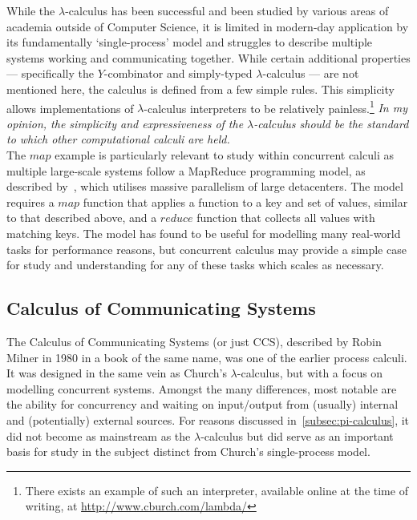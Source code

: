\documentclass{article}
\begin{document}
        
        \begin{remarks}
            While the $\lambda$-calculus has been successful and been studied by various areas of academia outside of Computer Science, it is limited in modern-day application by its fundamentally `single-process' model and struggles to describe multiple systems working and communicating together. 
            While certain additional properties --- specifically the $Y$-combinator and simply-typed $\lambda$-calculus --- are not mentioned here, the calculus is defined from a few simple rules.
            This simplicity allows implementations of $\lambda$-calculus interpreters to be relatively painless.\footnote{There exists an example of such an interpreter, available online at the time of writing, at \url{http://www.cburch.com/lambda/}}
            \textit{In my opinion, the simplicity and expressiveness of the $\lambda$-calculus should be the standard to which other computational calculi are held.}\\

            The ${map}$ example is particularly relevant to study within concurrent calculi as multiple large-scale systems follow a MapReduce programming model, as described by~\cite{mapreduce}, which utilises massive parallelism of large detacenters.
            The model requires a ${map}$ function that applies a function to a key and set of values, similar to that described above, and a ${reduce}$ function that collects all values with matching keys.
            The model has found to be useful for modelling many real-world tasks for performance reasons, but concurrent calculus may provide a simple case for study and understanding for any of these tasks which scales as necessary.

        \end{remarks}



    \subsection{Calculus of Communicating Systems}

        The Calculus of Communicating Systems (or just CCS), described by Robin Milner in 1980 in a book of the same name, was one of the earlier\footnotemark{} process calculi.
        It was designed in the same vein as Church's $\lambda$-calculus, but with a focus on modelling concurrent systems.
        Amongst the many differences, most notable are the ability for concurrency and waiting on input/output from (usually) internal and (potentially) external sources.
        For reasons discussed in~\ref{subsec:pi-calculus}, it did not become as mainstream as the $\lambda$-calculus but did serve as an important basis for study in the subject distinct from Church's single-process model.
\end{document}
